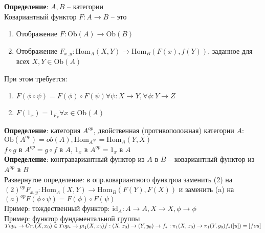 	\textbf{Определение}: $A, B$ -- категории\\
	Ковариантный функтор $F: A \rightarrow B$ -- это
	\begin{enumerate}
	\item Отображение $F: \text{Ob}(A)\rightarrow \text{Ob}(B)$
	\item Отображение $F_{x,y}: \text{Hom}_A (X,Y) \rightarrow \text{Hom}_B (F(x), f(Y))$, заданное для всех $X, Y \in \text{Ob}(A)$
	\end{enumerate}
	При этом требуется:
	\begin{enumerate}
	\item $F(\phi \circ \psi) = F(\phi) \circ F(\psi) \forall \psi: X\rightarrow Y, \forall \phi: Y\rightarrow Z$
	\item $F(1_x) = 1_{F_x} \forall x\in \text{Ob}(A)$
	\end{enumerate}
	\textbf{Определение}: категория $A^{op}$, двойственная (противоположная) категории $A$:\\
	$\text{Ob}(A^{op}) = ob(A), \text{Hom}_{A^{op}} = \text{Hom}_A (Y,X)$\\
	$f \circ g$ в $A^{op} = g \circ f$ в $A$, $1_x$ в $A^{op} = 1_x$ в $A$\\
	\textbf{Определение}: контравариантный функтор из $A$ в $B$ -- ковариантный функтор из $A^{op}$ в $B$\\
	Развернутое определение: в опр.ковариантного функтроа заменить (2) на\\
	$(2)^{op} F_{x,y}: \text{Hom}_A (X,Y) \rightarrow \text{Hom}_B (F(Y), F(X))$ и заменить (a) на\\
	$(a)^{op} F(\phi \circ \psi) = F(\phi) \circ F(\psi)$\\
	Пример: тождественный функтор: $ \text{id}_A: A\rightarrow A, X\rightarrow X, \phi \rightarrow \phi$\\
	Пример: функтор фундаментальной группы $Top_{\ast} \rightarrow Gr, (X,x_0) \in Top_{\ast} \rightarrow {pi}_1 (X,x_0)\\
	f: (X,x_0) \rightarrow (Y,y_0) \rightarrow f_{\ast}: {\pi}_1 (X,x_0) \rightarrow {\pi}_1 (Y,y_0)\\
	f_{\ast} ([u]) = [fou] $
	


\newpage
